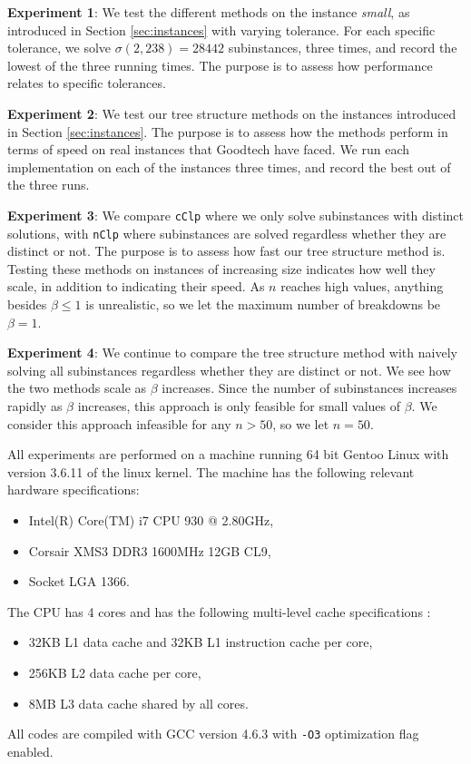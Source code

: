 \textbf{Experiment 1}:
We test the different
methods on the instance \textit{small}, as introduced in Section
\ref{sec:instances}  with varying tolerance.
For each specific tolerance, we solve $\sigma(2, 238) = 28442$ subinstances, three times,
and record the lowest of the three running times.
The purpose is to assess how performance relates to specific tolerances.

\textbf{Experiment 2}:
We test our tree structure methods on the instances introduced in Section
\ref{sec:instances}.
The purpose is to assess how the methods perform in terms of speed
on real instances that Goodtech have faced.
We run each implementation on each of the instances three times, and record
the best out of the three runs.

\textbf{Experiment 3}:
We compare \texttt{cClp} where we only solve subinstances with distinct
solutions, with \texttt{nClp} where subinstances are solved regardless
whether they are distinct or not.
The purpose is to assess how fast our tree structure method is.
Testing these methods on instances of increasing size indicates how well
they scale, in addition to indicating their speed. 
As $n$ reaches high values, anything besides $\beta \leq 1$ is unrealistic,
so we let the maximum number of breakdowns be $\beta = 1$.

\textbf{Experiment 4}:
We continue to compare the tree structure method with naively solving all
subinstances regardless whether they are distinct or not. We
see how the two methods scale as $\beta$ increases. Since the number
of subinstances increases rapidly as $\beta$ increases, this approach is only
feasible for small values of $\beta$. We consider this approach infeasible for
any $n > 50$, so we let $n = 50$.

All experiments are performed on a machine running 64 bit Gentoo Linux
with version 3.6.11 of the linux kernel. The machine has the following
relevant hardware specifications:
\begin{itemize}
    \item Intel(R) Core(TM) i7 CPU 930 @ 2.80GHz,
    \item Corsair XMS3 DDR3 1600MHz 12GB CL9,
    \item Socket LGA 1366.
\end{itemize}
The CPU has 4 cores and has the following multi-level cache specifications
\cite{intel}:
\begin{itemize}
    \item 32KB L1 data cache and 32KB L1 instruction cache per core,
    \item 256KB L2 data cache per core,
    \item 8MB L3 data cache shared by all cores.
\end{itemize}

All codes are compiled with GCC version 4.6.3 with \texttt{-O3}
optimization flag enabled.
